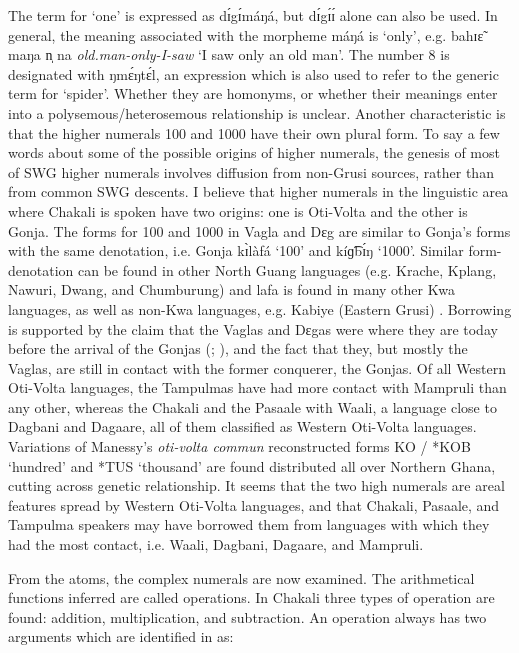 \begin{exe}
\begin{exe}
\begin{exe}
{\begin{exe}
\begin{exe}
\begin{exe}
\begin{exe}
\begin{exe}
\begin{exe}
\begin{exe}
\begin{exe}
\begin{exe}
The term for `one'  is expressed  as  {\sls dɪ́gɪ́máŋá},  but  {\sls dɪ́gɪ́ɪ́}
alone  can also
be used. In general, the meaning associated with the morpheme {\sls máŋá} is
`only', e.g.  {\sls bahɪɛ̃ maŋa n̩ na} {\it old.man-only-I-saw} `I saw only an 
old
man'. 
 The number 8 is designated with  {\sls ŋmɛ́ŋtɛ́l}, an expression which is also
used to refer to the generic term for  `spider'.  Whether they are homonyms,
or whether
 their
meanings enter into a polysemous/heterosemous relationship is unclear. Another
characteristic is that the higher
numerals 100 and 1000  have their own plural form. To say a few words about 
some of the possible origins of higher numerals, the genesis of most of SWG 
higher numerals involves diffusion from non-Grusi sources, rather than from  
common SWG descents. I believe that higher numerals in the linguistic area 
where Chakali is spoken have two origins: one is Oti-Volta and the other is 
Gonja. The  forms for 100 and 1000  in Vagla and Dɛg  are similar
to Gonja's forms with the same
denotation, i.e. Gonja {\sls  kɪ̀làfá} `100' and  {\sls  kíɡ͡bɪ́ŋ} `1000'.  
Similar
form-denotation can be found in other North Guang languages (e.g.
Krache, Kplang, Nawuri, Dwang, and Chumburung) and {\sls lafa} is found in many
other Kwa languages, as well as  non-Kwa languages, e.g. Kabiye (Eastern
Grusi)  \citep{Chan09}. Borrowing is  supported by the claim that the Vaglas
and Dɛgas were where they are today before the arrival of the Gonjas
(\citealt[12-13]{Good54}; \citealt[516]{Ratt32a}), and the fact that they, but
mostly the Vaglas, are still in contact with the former conquerer, the Gonjas. 
Of all Western  Oti-Volta languages, the Tampulmas have had more contact with
Mampruli  than any other, whereas the Chakali and the Pasaale
with Waali, a language close to  Dagbani and Dagaare, all of them classified as
Western  Oti-Volta languages. Variations of Manessy's {\it oti-volta commun}
reconstructed forms {\sls *KO / *KOB}  `hundred'  and {\sls 
*TUS}  `thousand'  are found
distributed all over Northern
Ghana, cutting across genetic relationship.  It seems that the two high
numerals are areal features spread by Western  Oti-Volta languages,   and that
Chakali, Pasaale, and Tampulma speakers may  have borrowed them from languages 
with which they had the most contact, i.e.   Waali, Dagbani, Dagaare,  and 
Mampruli.

From the atoms,  the complex numerals are now examined. The arithmetical 
functions inferred are called operations. In Chakali three types of operation 
are found: addition, multiplication, and subtraction. An operation always has 
two arguments which are identified in \citet{Gree78b} as: 


\end{exe}
\end{exe}
\end{exe}
\end{exe}
\end{exe}
\end{exe}
\end{exe}
\end{exe}
\end{exe}}
\end{exe}
\end{exe}
\end{exe}
